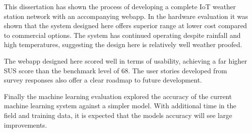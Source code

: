 This dissertation has shown the process of developing a complete IoT weather
station network with an accompanying webapp. In the hardware evaluation it was
shown that the system designed here offers superior range at lower cost compared
to commercial options. The system has continued operating despite rainfall and
high temperatures, suggesting the design here is relatively well weather proofed.

The webapp designed here scored well in terms of usability, achieving a far
higher SUS score than the benchmark level of 68. The user stories developed from
survey responses also offer a clear roadmap to future development.

Finally the machine learning evaluation explored the accuracy of the current
machine learning system against a simpler model. With additional time in the
field and training data, it is expected that the models accuracy will see large
improvements.